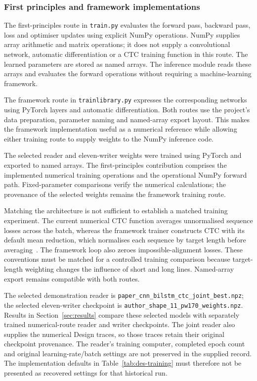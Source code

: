 \subsubsection{First principles and framework implementations}
\label{sec:des-implementations}
The first-principles route in \texttt{train.py} evaluates the forward pass, backward pass, loss and optimiser updates using explicit NumPy operations. NumPy supplies array arithmetic and matrix operations; it does not supply a convolutional network, automatic differentiation or a CTC training function in this route. The learned parameters are stored as named arrays. The inference module reads these arrays and evaluates the forward operations without requiring a machine-learning framework.


The framework route in \texttt{trainlibrary.py} expresses the corresponding networks using PyTorch layers and automatic differentiation. Both routes use the project's data preparation, parameter naming and named-array export layout. This makes the framework implementation useful as a numerical reference while allowing either training route to supply weights to the NumPy inference code.

The selected reader and eleven-writer weights were trained using PyTorch and exported to named arrays. The first-principles contribution comprises the implemented numerical training operations and the operational NumPy forward path. Fixed-parameter comparisons verify the numerical calculations; the provenance of the selected weights remains the framework training route.

Matching the architecture is not sufficient to establish a matched training experiment. The current numerical CTC function averages unnormalised sequence losses across the batch, whereas the framework trainer constructs CTC with its default mean reduction, which normalises each sequence by target length before averaging~\cite[CTCLoss, ``Parameters'' ]{pytorchctc}. The framework loop also zeroes impossible-alignment losses. These conventions must be matched for a controlled training comparison because target-length weighting changes the influence of short and long lines. Named-array export remains compatible with both routes.

The selected demonstration reader is \texttt{paper\_cnn\_bilstm\_ctc\_joint\_best.npz}; the selected eleven-writer checkpoint is \texttt{author\_shape\_11\_pw170\_weights.npz}. Results in Section~\ref{sec:results} compare these selected models with separately trained numerical-route reader and writer checkpoints. The joint reader also supplies the numerical Design traces, so those traces retain their original checkpoint provenance. The reader's training computer, completed epoch count and original learning-rate/batch settings are not preserved in the supplied record. The implementation defaults in Table~\ref{tab:des-training} must therefore not be presented as recovered settings for that historical run.

